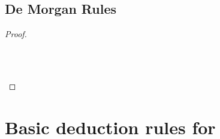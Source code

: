 \begin{multicols}{2}
\subsection*{De Morgan Rules}
\begin{proof}

\\	

\\	

\\	
\end{proof}
\end{multicols}


\newpage
\section*{Basic deduction rules for \FOL}

